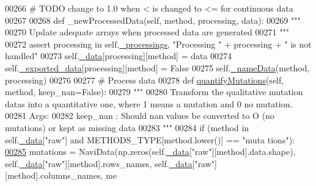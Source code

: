 \begin{DoxyCode}
00266         \textcolor{comment}{# TODO change to 1.0 when < is changed to <= for continuous data}
00267 
00268     \textcolor{keyword}{def }\_newProcessedData(self, method, processing, data):
00269         \textcolor{stringliteral}{"""}
00270 \textcolor{stringliteral}{        Update adequate arrays when processed data are generated}
00271 \textcolor{stringliteral}{        """}
00272         \textcolor{keyword}{assert} processing \textcolor{keywordflow}{in} self.\hyperlink{classnavicom_1_1navicom_1_1NaviCom_ac6a14d6a91cd2f236eef71496a6f249c}{_processings}, \textcolor{stringliteral}{"Processing "} + processing + \textcolor{stringliteral}{" is
       not handled"}
00273         self.\hyperlink{classnavicom_1_1navicom_1_1NaviCom_a407b2b5c30a5652ee85c4be54b3e6679}{_data}[processing][method] = data
00274         self.\hyperlink{classnavicom_1_1navicom_1_1NaviCom_ab7328fbbe89a1b3cb2db8c3d456d958f}{_exported_data}[processing][method] = \textcolor{keyword}{False}
00275         self.\hyperlink{classnavicom_1_1navicom_1_1NaviCom_a140128d0fd12930347cc2375c154072d}{_nameData}(method, processing)
00276 
00277     \textcolor{comment}{# Process data}
00278     \textcolor{keyword}{def }\hyperlink{classnavicom_1_1navicom_1_1NaviCom_a5314c49d6b9749693519a4a86cbfde71}{quantifyMutations}(self, method, keep\_nan=False):
00279         \textcolor{stringliteral}{"""}
00280 \textcolor{stringliteral}{        Transform the qualitative mutation datas into a quantitative one, where 1
       means a mutation and 0 no mutation.}
00281 \textcolor{stringliteral}{        Args:}
00282 \textcolor{stringliteral}{            keep\_nan : Should nan values be converted to O (no mutations) or kept
       as missing data}
00283 \textcolor{stringliteral}{        """}
00284         \textcolor{keywordflow}{if} (method \textcolor{keywordflow}{in} self.\hyperlink{classnavicom_1_1navicom_1_1NaviCom_a407b2b5c30a5652ee85c4be54b3e6679}{_data}[\textcolor{stringliteral}{"raw"}] \textcolor{keywordflow}{and} METHODS\_TYPE[method.lower()] == \textcolor{stringliteral}{"muta
      tions"}):
\hypertarget{navicom_8py_source_l00285}{}\hyperlink{classnavicom_1_1navicom_1_1NaviCom_a5314c49d6b9749693519a4a86cbfde71}{00285}             mutations = NaviData(np.zeros(self.\hyperlink{classnavicom_1_1navicom_1_1NaviCom_a407b2b5c30a5652ee85c4be54b3e6679}{_data}[\textcolor{stringliteral}{"raw"}][method].data.shape), 
      self.\hyperlink{classnavicom_1_1navicom_1_1NaviCom_a407b2b5c30a5652ee85c4be54b3e6679}{_data}[\textcolor{stringliteral}{"raw"}][method].rows\_names, self.\hyperlink{classnavicom_1_1navicom_1_1NaviCom_a407b2b5c30a5652ee85c4be54b3e6679}{_data}[\textcolor{stringliteral}{"raw"}][method].columns\_names, me

\end{DoxyCode}
